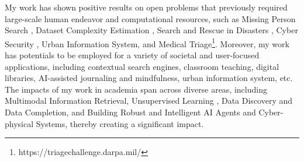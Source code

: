%
%
My work has shown positive results on open problems that previously required large-scale human endeavor and computational resources, such as Missing Person Search \cite{solaiman2021applying}, Dataset Complexity Estimation \cite{solaiman2023domainComplexity}, Search and Rescue in Disasters \cite{solaiman2013avra}, Cyber Security \cite{villarrealvasquez2020confoc, wang2015}, Urban Information System, and Medical Triage\footnote{https://triagechallenge.darpa.mil/}. %
Moreover, my work has potentials to be employed for a variety of societal and user-focused applications, including contextual search engines, classroom teaching, digital libraries, AI-assisted journaling and mindfulness, urban information system, etc.
The impacts of my work in academia span across diverse areas, including Multimodal Information Retrieval, Unsupervised Learning \cite{al2014minimal}, Data Discovery and Data Completion, and Building Robust and Intelligent AI Agents and Cyber-physical Systems, thereby creating a significant impact.
%


